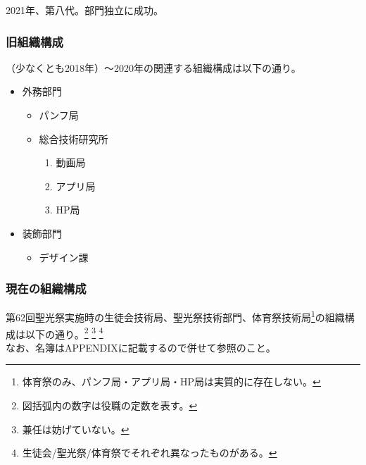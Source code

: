 \documentclass[dvipdfmx,jb5]{jarticle}
\begin{document}
2021年、第八代。部門独立に成功。

\subsubsection{旧組織構成}
（少なくとも2018年）〜2020年の関連する組織構成は以下の通り。
\begin{itemize}
\item 外務部門
  \begin{itemize}
  \item パンフ局
  \item 総合技術研究所
    \begin{enumerate}[−]
    \item 動画局
    \item アプリ局
    \item HP局
    \end{enumerate}
  \end{itemize}
\item 装飾部門
  \begin{itemize}
  \item デザイン課
  \end{itemize}
\end{itemize}

\subsubsection{現在の組織構成}
第62回聖光祭実施時の生徒会技術局、聖光祭技術部門、体育祭技術局\footnote{体育祭のみ、パンフ局・アプリ局・HP局は実質的に存在しない。}の組織構成は以下の通り。\footnote{図括弧内の数字は役職の定数を表す。} \footnote{兼任は妨げていない。} \footnote{生徒会/聖光祭/体育祭でそれぞれ異なったものがある。}\\
なお、名簿はAPPENDIXに記載するので併せて参照のこと。
\end{document}
